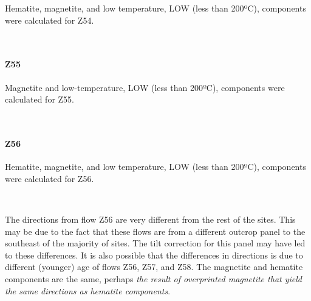 \documentclass[11pt]{article}
\begin{document}
    Hematite, magnetite, and low temperature, LOW (less than 200ºC),
components were calculated for Z54.



    \begin{center}
    \end{center}
    { \hspace*{\fill} \\}
    
    \paragraph{Z55}\label{z55}

    Magnetite and low-temperature, LOW (less than 200ºC), components were
calculated for Z55.



    \begin{center}
    \end{center}
    { \hspace*{\fill} \\}
    
    \paragraph{Z56}\label{z56}

    Hematite, magnetite, and low temperature, LOW (less than 200ºC),
components were calculated for Z56.



    \begin{center}
    \end{center}
    { \hspace*{\fill} \\}
    
    The directions from flow Z56 are very different from the rest of the
sites. This may be due to the fact that these flows are from a different
outcrop panel to the southeast of the majority of sites. The tilt
correction for this panel may have led to these differences. It is also
possible that the differences in directions is due to different
(younger) age of flows Z56, Z57, and Z58. The magnetite and hematite
components are the same, perhaps \emph{the result of overprinted
magnetite that yield the same directions as hematite components}.
\end{document}
